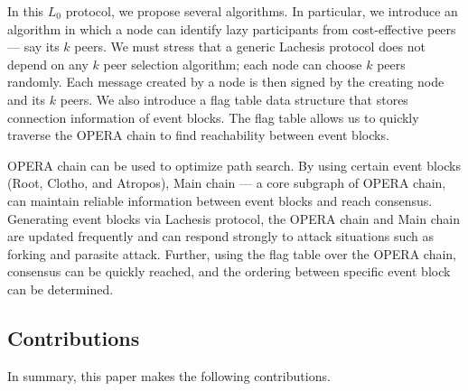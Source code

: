 \documentclass[preprint,12pt]{elsarticle}
\begin{document}
In this $L_0$ protocol, we propose several algorithms. In particular, we introduce an algorithm in which a node can identify lazy participants from cost-effective peers --- say its $k$ peers. We must stress that a generic Lachesis protocol does not depend on any $k$ peer selection algorithm; each node can choose $k$ peers randomly. Each message created by a node is then signed by the creating node and its $k$ peers. We also introduce a flag table data structure that stores connection information of event blocks. The flag table allows us to quickly traverse the OPERA chain to find reachability between event blocks.

OPERA chain can be used to optimize path search. 
By using certain event blocks (Root, Clotho, and Atropos), Main chain --- a core subgraph of OPERA chain, can maintain reliable information between event blocks and reach consensus.  Generating event blocks via Lachesis protocol, the OPERA chain and Main chain are updated frequently and can respond strongly to attack situations such as forking and parasite attack. Further, using the flag table over the OPERA chain, consensus can be quickly reached, and the ordering between specific event block can be determined.







\subsection{Contributions}

In summary, this paper makes the following contributions.
\end{document}
